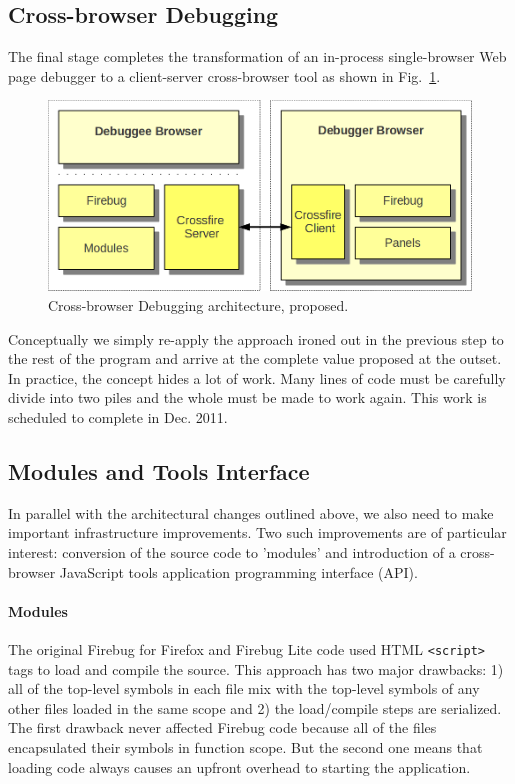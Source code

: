 \subsection{Cross-browser Debugging}
The final stage completes the transformation of an in-process single-browser Web
page debugger to a client-server cross-browser tool as shown in
Fig.~\ref{fig:crossbrowser}. \begin{figure}[htp]
  \includegraphics  [width = 86 mm] {figures/crossbrowser.png}
  \caption{Cross-browser Debugging architecture, proposed.}
 \label{fig:crossbrowser}
\end{figure}
Conceptually we simply re-apply the approach ironed out in the previous step to
the rest of the program and arrive at the complete value proposed at the outset.
In practice, the concept hides a lot of work. Many lines of code must be
carefully divide into two piles and the whole must be made to work again. This
work is scheduled to complete in Dec. 2011.

\subsection{Modules and Tools Interface}
In parallel with the architectural changes outlined above, we also need to make
important infrastructure improvements. Two such improvements are of particular
interest: conversion of the source code to 'modules' and introduction of a
cross-browser JavaScript tools application programming interface (API).


\paragraph{Modules} The original Firebug for Firefox and Firebug Lite code used
HTML \texttt{<script>} tags to load and compile the source. This approach has
two major drawbacks: 1) all of the top-level symbols in each file mix with the
top-level symbols of any other files loaded in the same scope and 2) the
load/compile steps are serialized. The first drawback never affected Firebug
code because all of the files encapsulated their symbols in function scope. But
the second one means that loading code always causes an upfront overhead to
starting the application.


